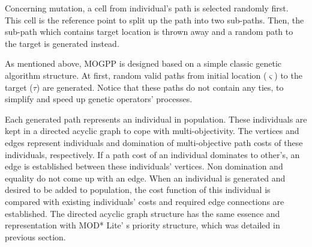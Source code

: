 \documentclass[10pt,journal]{IEEEtran}
\begin{document}
Concerning mutation,  a cell from individual's path is selected randomly first. This cell is the reference point to split up the path into two sub-paths. Then, the sub-path which contains target location is thrown away and a random path to the target is generated instead. %





As mentioned above, MOGPP is designed based on a simple classic genetic algorithm structure. At first, random valid paths from initial location ($\varsigma$) to the target ($\tau$) are generated. Notice that these paths do not contain any ties, to simplify and speed up genetic operators' processes.

Each generated path represents an individual in population. These individuals are kept in a directed acyclic graph to cope with multi-objectivity. The vertices and edges represent individuals and domination of multi-objective path costs of these individuals, respectively. If a path cost of an individual dominates to other's, an edge is established between these individuals' vertices. Non domination and equality do not come up with an edge. When an individual is generated and desired to be added to population, the cost function of this individual is compared with existing individuals' costs and required edge connections are established. The directed acyclic graph structure has the same essence and representation with MOD* Lite' s priority structure, which was detailed in previous section.
\end{document}
